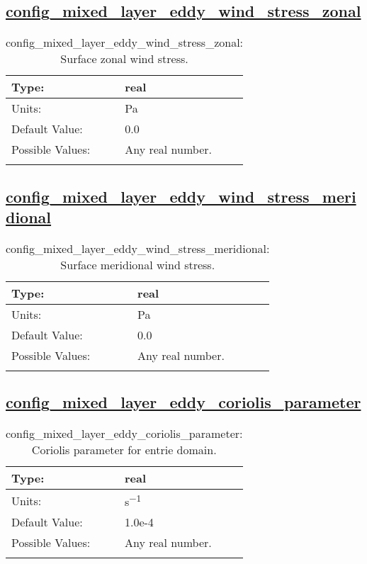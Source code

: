 \subsection[config\_mixed\_layer\_eddy\_wind\_stress\_zonal]{\hyperref[sec:nm_tab_mixed_layer_eddy]{config\_mixed\_layer\_eddy\_wind\_stress\_zonal}}
\label{subsec:nm_sec_config_mixed_layer_eddy_wind_stress_zonal}
\begin{center}
\begin{longtable}{| p{2.0in} || p{4.0in} |}
    \hline
    Type: & real \\
    \hline
    Units: & \si{Pa} \\
    \hline
    Default Value: & 0.0 \\
    \hline
    Possible Values: & Any real number. \\
    \hline
    \caption{config\_mixed\_layer\_eddy\_wind\_stress\_zonal: Surface zonal wind stress.}
\end{longtable}
\end{center}
\subsection[config\_mixed\_layer\_eddy\_wind\_stress\_meridional]{\hyperref[sec:nm_tab_mixed_layer_eddy]{config\_mixed\_layer\_eddy\_wind\_stress\_meridional}}
\label{subsec:nm_sec_config_mixed_layer_eddy_wind_stress_meridional}
\begin{center}
\begin{longtable}{| p{2.0in} || p{4.0in} |}
    \hline
    Type: & real \\
    \hline
    Units: & \si{Pa} \\
    \hline
    Default Value: & 0.0 \\
    \hline
    Possible Values: & Any real number. \\
    \hline
    \caption{config\_mixed\_layer\_eddy\_wind\_stress\_meridional: Surface meridional wind stress.}
\end{longtable}
\end{center}
\subsection[config\_mixed\_layer\_eddy\_coriolis\_parameter]{\hyperref[sec:nm_tab_mixed_layer_eddy]{config\_mixed\_layer\_eddy\_coriolis\_parameter}}
\label{subsec:nm_sec_config_mixed_layer_eddy_coriolis_parameter}
\begin{center}
\begin{longtable}{| p{2.0in} || p{4.0in} |}
    \hline
    Type: & real \\
    \hline
    Units: & \si{s^{-1}} \\
    \hline
    Default Value: & 1.0e-4 \\
    \hline
    Possible Values: & Any real number. \\
    \hline
    \caption{config\_mixed\_layer\_eddy\_coriolis\_parameter: Coriolis parameter for entrie domain.}
\end{longtable}
\end{center}
